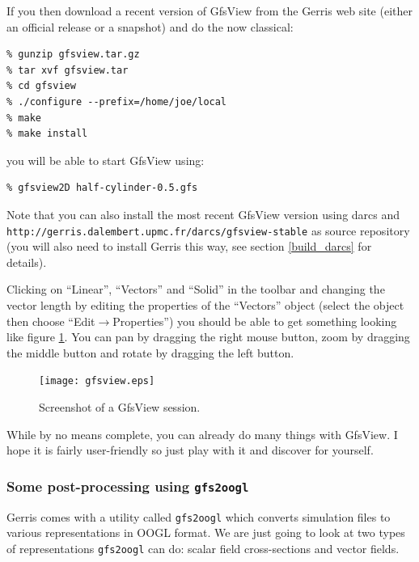 \documentclass[a4paper]{article}
\begin{document}
If you then download a recent version of GfsView from the Gerris web
site (either an official release or a snapshot) and do the now classical:
\begin{verbatim}
% gunzip gfsview.tar.gz
% tar xvf gfsview.tar
% cd gfsview
% ./configure --prefix=/home/joe/local
% make
% make install
\end{verbatim}
you will be able to start GfsView using:
\begin{verbatim}
% gfsview2D half-cylinder-0.5.gfs
\end{verbatim}
Note that you can also install the most recent GfsView version using
darcs and {\tt http://gerris.dalembert.upmc.fr/darcs/gfsview-stable} as source
repository (you will also need to install Gerris this way, see section
\ref{build_darcs} for details).

Clicking on ``Linear'', ``Vectors'' and ``Solid'' in the toolbar and
changing the vector length by editing the properties of the
``Vectors'' object (select the object then choose
``Edit$\rightarrow$Properties'') you should be able to get something
looking like figure \ref{fig:gfsview}. You can pan by dragging the right
mouse button, zoom by dragging the middle button and rotate by
dragging the left button.
\begin{figure}[htbp]
\begin{center}
\texttt{[image: gfsview.eps]}
\end{center}
\caption{Screenshot of a GfsView session.}
\label{fig:gfsview}
\end{figure}

While by no means complete, you can already do many things with
GfsView. I hope it is fairly user-friendly so just play with it and
discover for yourself.

\subsubsection{Some post-processing using {\tt gfs2oogl}}

Gerris comes with a utility called {\tt gfs2oogl} which converts
simulation files to various representations in {\sc OOGL} format. We are
just going to look at two types of representations {\tt gfs2oogl} can
do: scalar field cross-sections and vector fields.
\end{document}
